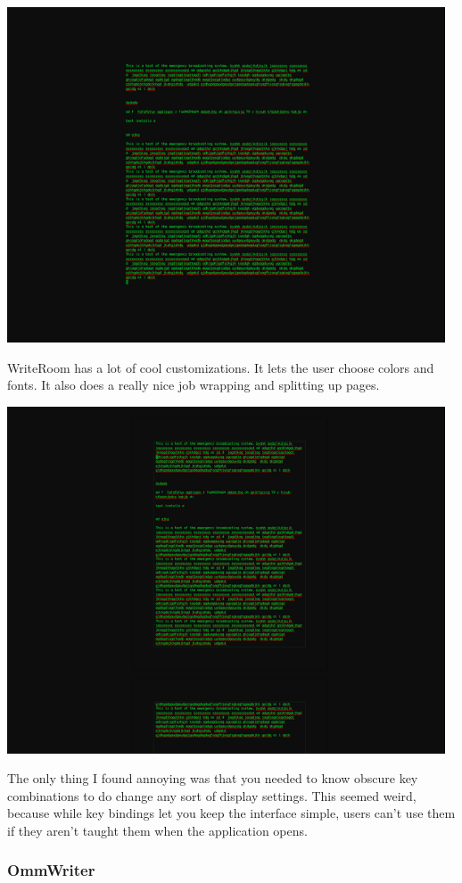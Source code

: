 \documentclass[11pt]{article}
\begin{document}
\includegraphics[width=130mm]{images/writeroom1.png}

WriteRoom has a lot of cool customizations. It lets the user choose colors and fonts. It also does a really nice job wrapping and splitting up pages.

\includegraphics[width=130mm]{images/writeroom2.png}

The only thing I found annoying was that you needed to know obscure key combinations to do change any sort of display settings. This seemed weird, because while key bindings let you keep the interface simple, users can't use them if they aren't taught them when the application opens.

\subsubsection{OmmWriter}
\end{document}

